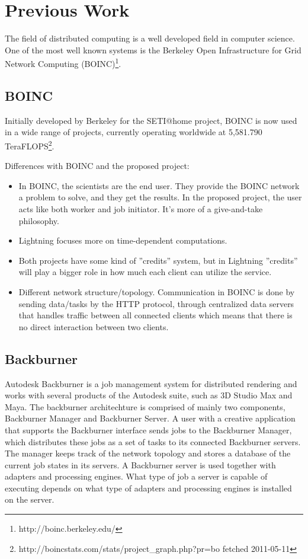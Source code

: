 \chapter{Previous Work}
The field of distributed computing is a well developed field in computer
science. One of the most well known systems is the Berkeley Open Infrastructure
for Grid Network Computing (BOINC)\footnote{http://boinc.berkeley.edu/}.
	



\section{BOINC}
Initially developed by Berkeley for the SETI@home project, BOINC is now used in
a wide range of projects, currently operating worldwide at 5,581.790 
TeraFLOPS\footnote{http://boincstats.com/stats/project\_graph.php?pr=bo 
fetched 2011-05-11}.

Differences with BOINC and the proposed project:
\begin{itemize}
	\item In BOINC, the scientists are the end user. They provide the BOINC network
		a problem to solve, and they get the results. In the proposed project, 
		the user acts like both worker and job initiator. It’s more of a 
		give-and-take philosophy.
	\item Lightning focuses more on time-dependent computations.
	\item Both projects have some kind of ''credits'' system, but in Lightning
		''credits'' will play a bigger role in how much each client can utilize the service.
	\item Different network structure/topology. Communication in BOINC is done
		by sending data/tasks by the HTTP protocol, through centralized data
		servers that handles traffic between all connected clients which means 
		that there is no direct interaction between two clients. 
\end{itemize}

\section{Backburner}

Autodesk Backburner is a job management system for distributed rendering and works with several products of the Autodesk suite, such as 3D Studio Max and Maya. The backburner architechture is comprised of mainly two components, Backburner Manager and Backburner Server. A user with a creative application that supports the Backburner interface sends jobs to the Backburner Manager, which distributes these jobs as a set of tasks to its connected Backburner servers. The manager keeps track of the network topology and stores a database of the current job states in its servers. A Backburner server is used together with adapters and processing engines. What type of job a server is capable of executing depends on what type of adapters and processing engines is installed on the server. 

